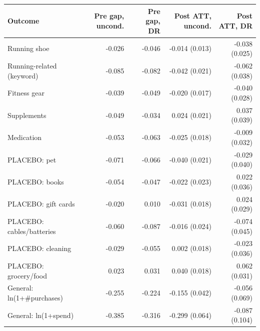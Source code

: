 \begin{tabular}{lrrrr}
\toprule
Outcome & Pre gap, uncond. & Pre gap, DR & Post ATT, uncond. & Post ATT, DR \\
\midrule
Running shoe & -0.026 & -0.046 & -0.014 (0.013) & -0.038 (0.025) \\
Running-related (keyword) & -0.085 & -0.082 & -0.042 (0.021) & -0.062 (0.038) \\
Fitness gear & -0.039 & -0.049 & -0.020 (0.017) & -0.040 (0.028) \\
Supplements & -0.049 & -0.034 & 0.024 (0.021) & 0.037 (0.039) \\
Medication & -0.053 & -0.063 & -0.025 (0.018) & -0.009 (0.032) \\
PLACEBO: pet & -0.071 & -0.066 & -0.040 (0.021) & -0.029 (0.040) \\
PLACEBO: books & -0.054 & -0.047 & -0.022 (0.023) & 0.022 (0.036) \\
PLACEBO: gift cards & -0.020 & 0.010 & -0.031 (0.018) & 0.024 (0.029) \\
PLACEBO: cables/batteries & -0.060 & -0.087 & -0.016 (0.024) & -0.074 (0.045) \\
PLACEBO: cleaning & -0.029 & -0.055 & 0.002 (0.018) & -0.023 (0.036) \\
PLACEBO: grocery/food & 0.023 & 0.031 & 0.040 (0.018) & 0.062 (0.031) \\
General: ln(1+\#purchases) & -0.255 & -0.224 & -0.155 (0.042) & -0.056 (0.069) \\
General: ln(1+spend) & -0.385 & -0.316 & -0.299 (0.064) & -0.087 (0.104) \\
\bottomrule
\end{tabular}
